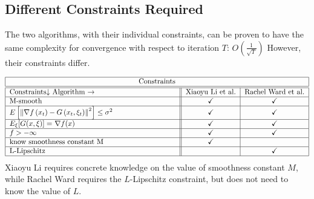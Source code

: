 \documentclass[14pt,onecolumn,letterpaper]{extarticle}
\begin{document}
\subsection{Different Constraints Required}
The two algorithms, with their individual constraints, can be proven to have the same complexity for convergence with respect to iteration $T$: $O(\frac{1}{\sqrt{T}})$ However, their constraints differ.\par\vspace{3mm}
\begin{align*}
\begin{tabular}{ |p{8cm}||c|c|  }
 \hline
 \multicolumn{3}{|c|}{Constraints} \\
 \hline\hline
 Constraints$\downarrow$ Algorithm $\rightarrow$ & Xiaoyu Li et al. &Rachel Ward et al.\\
 \hline
 M-smooth   & \checkmark    &\checkmark\\
 \hline
 $E\left[\left\|\nabla f\left(x_t\right)-G\left(x_t, \xi_t\right)\right\|^2\right]\leq\sigma^2$&   \checkmark  & \checkmark\\
 \hline
 $E_{\xi}[G(x, \xi)]=$ $\nabla f(x)$ & \checkmark & \checkmark\\
 \hline
 $f > -\infty$    & \checkmark & \checkmark\\
 \hline
 know smoothness constant M
&\checkmark &  \\
 \hline
 L-Lipschitz &   & \checkmark\\
 \hline
\end{tabular}
\end{align*}
Xiaoyu Li requires concrete knowledge on the value of smoothness constant $M$, while Rachel Ward requires the $L$-Lipschitz constraint, but does not need to know the value of $L$.
\end{document}
